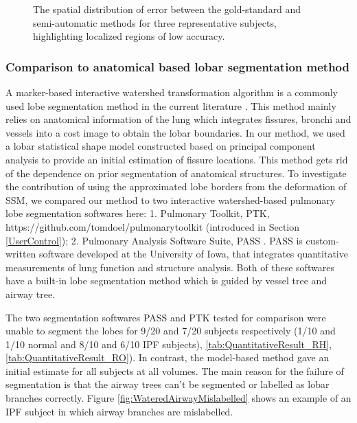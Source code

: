 {\begin{figure}[htbp]
\begin{subfigure}{.38 \linewidth}
  \caption{}
  \label{fig:QuanlititativeResult-c} 
\end{subfigure}
\caption{The spatial distribution of error between the gold-standard and semi-automatic methods for three representative subjects, highlighting localized regions of low accuracy.}
\label{fig:QuanlititativeResult}
\end{figure}

\subsubsection{Comparison to anatomical based lobar segmentation method}
A marker-based interactive watershed transformation algorithm is a commonly used lobe segmentation method in the current literature \citep{ukil2009anatomy,pu2009pulmonary,lassen2011interactive,lassen2013automatic}. This method mainly relies on anatomical information of the lung which integrates fissures, bronchi and vessels into a cost image to obtain the lobar boundaries. In our method, we used a lobar statistical shape model constructed based on principal component analysis to provide an initial estimation of fissure locations. This method gets rid of the dependence on prior segmentation of anatomical structures. To investigate the contribution of using the approximated lobe borders from the deformation of SSM, we compared our method to two interactive watershed-based pulmonary lobe segmentation softwares here: 1. Pulmonary Toolkit, PTK, https://github.com/tomdoel/pulmonarytoolkit (introduced in Section \ref{UserControl}); 2. Pulmonary Analysis Software Suite, PASS \citep{guo2008pulmonary}. PASS is custom-written software developed at the University of Iowa, that integrates quantitative measurements of lung function and structure analysis. Both of these softwares have a built-in lobe segmentation method which is guided by vessel tree and airway tree.

The two segmentation softwares PASS and PTK tested for comparison were unable to segment the lobes for 9/20 and 7/20 subjects respectively (1/10 and 1/10 normal and 8/10 and 6/10 IPF subjects), \ref{tab:QuantitativeResult_RH}, \ref{tab:QuantitativeResult_RO}). In contrast, the model-based method gave an initial estimate for all subjects at all volumes. The main reason for the failure of segmentation is that the airway trees can't be segmented or labelled as lobar branches correctly. Figure \ref{fig:WateredAirwayMislabelled} shows an example of an IPF subject in which airway branches are mislabelled. 
\newpage

}
